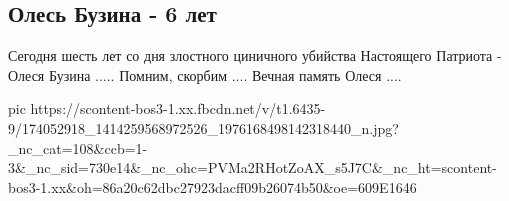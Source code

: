  
 
 
 
 

\subsection{Олесь Бузина - 6 лет}
\label{sec:16_04_2021.fb.berezhnaja_elena.1.buzina_oles}

Сегодня шесть лет со дня злостного циничного убийства Настоящего Патриота  -
Олеся Бузина ..... Помним, скорбим .... Вечная память Олеся ....

\ifcmt
  pic https://scontent-bos3-1.xx.fbcdn.net/v/t1.6435-9/174052918_1414259568972526_1976168498142318440_n.jpg?_nc_cat=108&ccb=1-3&_nc_sid=730e14&_nc_ohc=PVMa2RHotZoAX_s5J7C&_nc_ht=scontent-bos3-1.xx&oh=86a20c62dbc27923dacff09b26074b50&oe=609E1646
\fi

